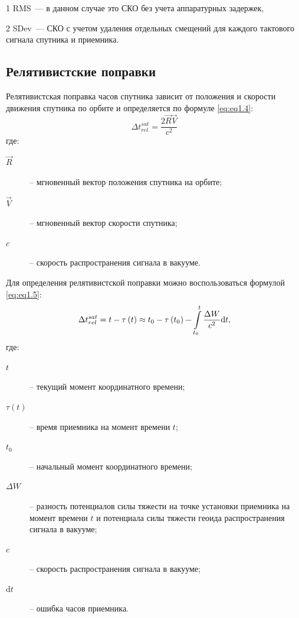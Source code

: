 \begin{table} [htbp]
\begin{threeparttable}
\begin{tabular}{|cc|c|c|c|}
	\end{tabular}  
	\begin{tablenotes}
		\item [1] RMS~--- в данном случае это СКО без учета аппаратурных задержек, 
		\item [2] SDev~--- СКО с учетом удаления отдельных смещений для каждого тактового сигнала спутника и приемника.
	\end{tablenotes}
	\end{threeparttable}
\end{table}



\subsection{Релятивистские поправки}\label{subsec:ch1/sec3/sub2}

Релятивистская поправка часов спутника зависит от положения и скорости движения спутника по орбите \cite{src38, src39} и определяется по формуле \cref{eq:eq1.4}:
\begin{equation}
	\label{eq:eq1.4}
	\Delta t_{rel}^{sat}=\frac{2\overrightarrow{R}\overrightarrow{V}}{c^{2}}
\end{equation}
где: 
\begin{description}
	\item[$\overrightarrow{R}$] -- мгновенный вектор положения спутника на орбите; 
	\item[$\overrightarrow{V}$] -- мгновенный вектор скорости спутника;
	\item[$c$] -- скорость распространения сигнала в вакууме.
\end{description}

Для определения релятивистской поправки можно воспользоваться формулой \cref{eq:eq1.5}: 
\begin{equation}
	\label{eq:eq1.5}
	\Delta t_{rel}^{sat}=t-\tau\left(t\right)\approx t_{0}-\tau\left(t_{0}\right)-\intop_{t_{0}}^{t}\frac{\Delta W}{c^{2}}\mathrm{d}t,
\end{equation}
где: 
\begin{description}
	\item[$t$] -- текущий момент координатного времени; 
	\item[$\tau\left(t\right)$] -- время приемника на момент времени $t$;
	\item[$t_{0}$] -- начальный момент координатного времени;
	\item[$\Delta W$] -- разность потенциалов силы тяжести на точке установки приемника на момент времени $t$ и потенциала силы тяжести геоида распространения сигнала в вакууме;
	\item[$c$] -- скорость распространения сигнала в вакууме;
	\item[$\mathrm{d}t$] -- ошибка часов приемника.
\end{description}


